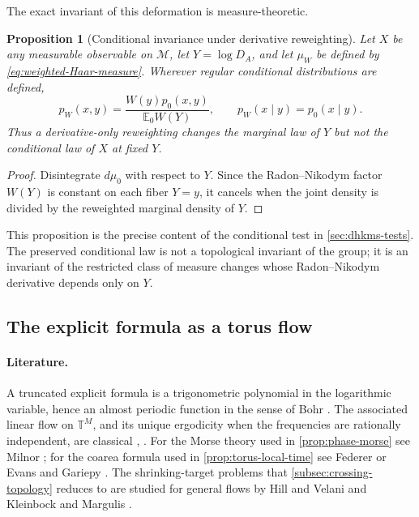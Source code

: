 \documentclass[11pt,reqno]{amsart}
\newtheorem{proposition}{Proposition}
\theoremstyle{remark}
\newcommand{\T}{\mathbb{T}}
\begin{document}
The exact invariant of this deformation is measure-theoretic.

\begin{proposition}[Conditional invariance under derivative reweighting]
\label{prop:conditional-invariance}
Let $X$ be any measurable observable on $\mathcal M$, let $Y=\log D_A$, and let $\mu_W$ be defined by \eqref{eq:weighted-Haar-measure}.  Wherever regular conditional distributions are defined,
\begin{equation}
  p_W(x,y)
  =\frac{W(y)p_0(x,y)}{\mathbb E_0W(Y)},
  \qquad
  p_W(x\mid y)=p_0(x\mid y).
  \label{eq:excision-factorization}
\end{equation}
Thus a derivative-only reweighting changes the marginal law of $Y$ but not the conditional law of $X$ at fixed $Y$.
\end{proposition}

\begin{proof}
Disintegrate $d\mu_0$ with respect to $Y$.  Since the Radon--Nikodym factor $W(Y)$ is constant on each fiber $Y=y$, it cancels when the joint density is divided by the reweighted marginal density of $Y$.
\end{proof}

This proposition is the precise content of the conditional test in \cref{sec:dhkms-tests}.  The preserved conditional law is not a topological invariant of the group; it is an invariant of the restricted class of measure changes whose Radon--Nikodym derivative depends only on $Y$.

\subsection{The explicit formula as a torus flow}
\label{subsec:torus-flow}

\paragraph{Literature.}
A truncated explicit formula is a trigonometric polynomial in the logarithmic variable, hence an almost periodic function in the sense of Bohr \cite{Bohr1947}.  The associated linear flow on $\T^M$, and its unique ergodicity when the frequencies are rationally independent, are classical \cite{CFS1982}, \cite{KatokHasselblatt1995}.  For the Morse theory used in \cref{prop:phase-morse} see Milnor \cite{Milnor1963}; for the coarea formula used in \cref{prop:torus-local-time} see Federer \cite{Federer1969} or Evans and Gariepy \cite[Ch.~3]{EvansGariepy1992}.  The shrinking-target problems that \cref{subsec:crossing-topology} reduces to are studied for general flows by Hill and Velani \cite{HillVelani1995} and Kleinbock and Margulis \cite{KleinbockMargulis1999}.
\end{document}
